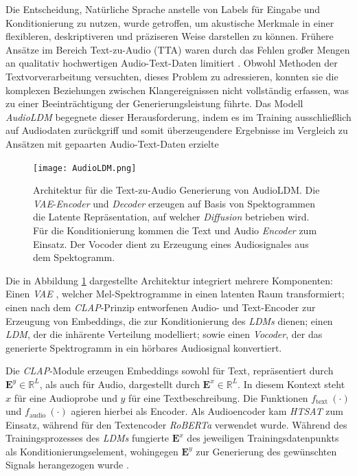 \documentclass[
  a4paper,  %
  twoside,  %
  bibliography=totoc,
  headsepline,
  cleardoublepage=empty,
  parskip=half,
  draft=false
]{scrbook}
\begin{document}
Die Entscheidung, Natürliche Sprache anstelle von Labels für Eingabe und Konditionierung zu nutzen, wurde getroffen, um akustische Merkmale in einer flexibleren, deskriptiveren und präziseren Weise darstellen zu können. Frühere Ansätze im Bereich Text-zu-Audio (TTA) waren durch das Fehlen großer Mengen an qualitativ hochwertigen Audio-Text-Daten limitiert \cite{liu_separate_2022}. Obwohl Methoden der Textvorverarbeitung \cite{gemmeke_audio_2017, yang_diffsound_2023} versuchten, dieses Problem zu adressieren, konnten sie die komplexen Beziehungen zwischen Klangereignissen nicht vollständig erfassen, was zu einer Beeinträchtigung der Generierungsleistung führte. Das Modell \emph{AudioLDM} begegnete dieser Herausforderung, indem es im Training ausschließlich auf Audiodaten zurückgriff und somit überzeugendere Ergebnisse im Vergleich zu Ansätzen mit gepaarten Audio-Text-Daten erzielte \cite{liu_audioldm_2023}


\begin{figure}[h]
  \centering
  \texttt{[image: AudioLDM.png]}
  \caption[AudioLDM Architektur]{Architektur für die Text-zu-Audio Generierung von AudioLDM. Die \emph{VAE}-\emph{Encoder} und \emph{Decoder} erzeugen auf Basis von Spektogrammen die Latente Repräsentation, auf welcher \emph{Diffusion} betrieben wird. Für die Konditionierung kommen die Text und Audio \emph{Encoder} zum Einsatz. Der Vocoder dient zu Erzeugung eines Audiosignales aus dem Spektogramm.\cite{liu_audioldm_2023}}
  \label{fig:AudioLDM}
\end{figure} 

Die in Abbildung \ref{fig:AudioLDM} dargestellte Architektur integriert mehrere Komponenten: Einen \emph{VAE} \cite{kingma_auto-encoding_2022}, welcher Mel-Spektrogramme in einen latenten Raum transformiert; einen nach dem \emph{CLAP}-Prinzip \cite{wu_large-scale_2023} entworfenen Audio- und Text-Encoder zur Erzeugung von Embeddings, die zur Konditionierung des \emph{LDMs} dienen; einen \emph{LDM}, der die inhärente Verteilung modelliert; sowie einen \emph{Vocoder}, der das generierte Spektrogramm in ein hörbares Audiosignal konvertiert. \cite{liu_audioldm_2023}

Die \emph{CLAP}-Module erzeugen Embeddings sowohl für Text, repräsentiert durch $\boldsymbol{E}^y \in \mathbb{R}^L$, als auch für Audio, dargestellt durch $\boldsymbol{E}^x \in \mathbb{R}^L$. In diesem Kontext steht $x$ für eine Audioprobe und $y$ für eine Textbeschreibung. Die Funktionen $f_{\text {text }}(\cdot)$ und $f_{\text {audio }}(\cdot)$ agieren hierbei als Encoder. Als Audioencoder kam \emph{HTSAT} \cite{chen_hts-at_2022} zum Einsatz, während für den Textencoder \emph{RoBERTa} \cite{liu_roberta_2019} verwendet wurde. Während des Trainingsprozesses des \emph{LDMs} fungierte $\boldsymbol{E}^x$ des jeweiligen Trainingsdatenpunkts als Konditionierungselement, wohingegen $\boldsymbol{E}^y$ zur Generierung des gewünschten Signals herangezogen wurde \cite{liu_audioldm_2023}.
\end{document}
